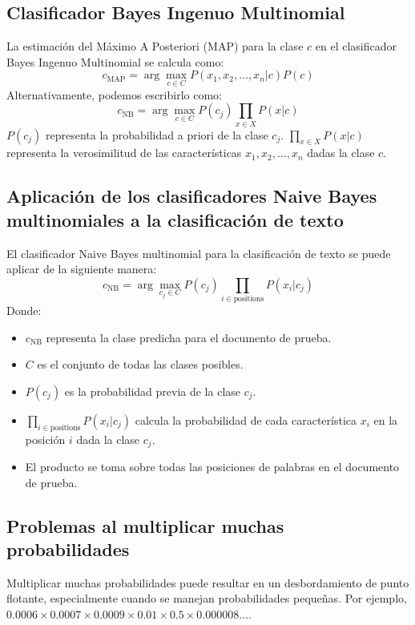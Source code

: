 \subsection{Clasificador Bayes Ingenuo Multinomial}
La estimación del Máximo A Posteriori (MAP) para la clase $c$ en el clasificador Bayes Ingenuo Multinomial se calcula como:
    \[
    c_{\text{MAP}} = \arg\max_{c \in C} P(x_1, x_2, \ldots, x_n | c)P(c)
    \]
Alternativamente, podemos escribirlo como:
    \[
    c_{\text{NB}} = \arg\max_{c \in C} P(c_j) \prod_{x \in X} P(x | c)
    \]
$P(c_j)$ representa la probabilidad a priori de la clase $c_j$.
$\prod_{x \in X} P(x | c)$ representa la verosimilitud de las características $x_1, x_2, \ldots, x_n$ dadas la clase $c$.


\subsection{Aplicación de los clasificadores Naive Bayes multinomiales a la clasificación de texto}

El clasificador Naive Bayes multinomial para la clasificación de texto se puede aplicar de la siguiente manera:
\[
c_{\text{NB}} = \arg\max_{c_j \in C} P(c_j) \prod_{i \in \text{positions}} P(x_i | c_j)
\]
Donde:
\begin{itemize}
    \item $c_{\text{NB}}$ representa la clase predicha para el documento de prueba.
    \item $C$ es el conjunto de todas las clases posibles.
    \item $P(c_j)$ es la probabilidad previa de la clase $c_j$.
    \item $\prod_{i \in \text{positions}} P(x_i | c_j)$ calcula la probabilidad de cada característica $x_i$ en la posición $i$ dada la clase $c_j$.
    \item El producto se toma sobre todas las posiciones de palabras en el documento de prueba.
\end{itemize}

\subsection{Problemas al multiplicar muchas probabilidades}

Multiplicar muchas probabilidades puede resultar en un desbordamiento de punto flotante, especialmente cuando se manejan probabilidades pequeñas. Por ejemplo, $0.0006 \times 0.0007 \times 0.0009 \times 0.01 \times 0.5 \times 0.000008 \ldots$.

